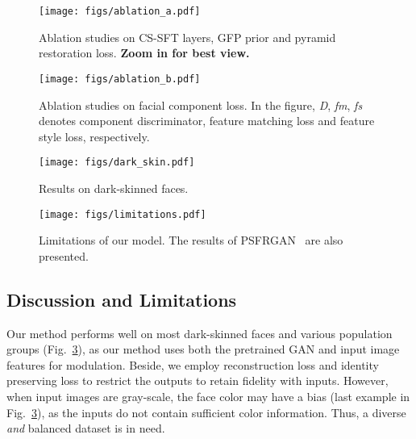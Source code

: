 \documentclass[final]{cvpr}
\begin{document}
\begin{figure}[!t]
	\small
	\vspace{-0.4cm}
	\begin{center}
\texttt{[image: figs/ablation\_a.pdf]}
	\end{center}
	\vspace{-0.7cm}
	\caption{Ablation studies on CS-SFT layers, GFP prior and pyramid restoration loss. \textbf{Zoom in for best view.}}
	\label{fig:ablation_a}
	\vspace{-0.2cm}
\end{figure}

\begin{figure}[!t]
	\small
\begin{center}
\texttt{[image: figs/ablation\_b.pdf]}
	\end{center}
	\vspace{-0.7cm}
	\caption{Ablation studies on facial component loss. In the figure, \textit{D}, \textit{fm}, \textit{fs} denotes component discriminator, feature matching loss and feature style loss, respectively.}
	\label{fig:ablation_b}
	\vspace{-0.2cm}
\end{figure}

\begin{figure}[]
	\vspace{-0.6cm}
	\begin{center}
\texttt{[image: figs/dark\_skin.pdf]}
	\end{center}
	\vspace{-0.8cm}
	\caption{Results on dark-skinned faces.}
	\label{fig:dark-skinned}
	\vspace{-0.4cm}
\end{figure}

\begin{figure}[!t]
	\small
\begin{center}
\texttt{[image: figs/limitations.pdf]}
	\end{center}
	\vspace{-0.7cm}
	\caption{Limitations of our model. The results of PSFRGAN~\cite{chen2020psfrgan} are also presented.}
	\label{fig:limitations}
	\vspace{-0.5cm}
\end{figure}

\vspace{-0.3cm}
\subsection{Discussion and Limitations}\label{subsec:limitations}
Our method performs well on most dark-skinned faces and various population groups (Fig.~\ref{fig:dark-skinned}), as our method uses both the pretrained GAN and input image features for modulation. Beside, we employ reconstruction loss and identity preserving loss to restrict the outputs to retain fidelity with inputs.
However, when input images are gray-scale, the face color may have a bias (last example in Fig.~\ref{fig:dark-skinned}), as the inputs do not contain sufficient color information. Thus, a diverse \textit{and} balanced dataset is in need. 
\end{document}

